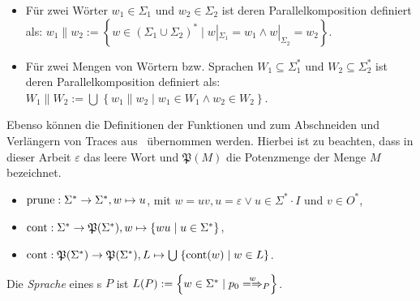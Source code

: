 \begin{Def}\mbox{}
  \begin{itemize}
    \item Für zwei Wörter $w_1\in\Sigma _1$ und $w_2\in\Sigma _2$ ist
      deren Parallelkomposition definiert als: $w_1\| w_2:=\left\{w\in
      (\Sigma _1\cup\Sigma _2)^*\mid w|_{\Sigma _1}=w_1\wedge w|_{\Sigma
    _2}=w_2\right\}$.
    \item Für zwei Mengen von Wörtern bzw. Sprachen $W_1\subseteq \Sigma
      ^*_1$ und $W_2\subseteq \Sigma ^*_2$ ist deren Parallelkomposition
      definiert als: $W_1\| W_2:=\bigcup\hspace{1pt}\left\{w_1\| w_2\mid
      w_1\in W_1\wedge w_2\in W_2\right\}$.
  \end{itemize}
\end{Def}

Ebenso können die Definitionen der Funktionen \prune{} und \cont{} zum
Abschneiden und Verlängern von Traces aus~\cite{Schinko2016BA} übernommen
werden. Hierbei ist zu beachten, dass in dieser Arbeit $\varepsilon$ das leere
Wort und $\mathfrak{P}(M)$ die Potenzmenge der Menge $M$ bezeichnet.

\begin{Def}\mbox{}
  \begin{itemize}
    \item $\mathrm{prune}{}:\Sigma ^*\rightarrow\Sigma ^*, w\mapsto u$, mit $w=uv,
      u=\varepsilon\vee u\in\Sigma ^*\cdot I$ und $v\in O^*$,
    \item $\mathrm{cont}{}:\Sigma ^*\rightarrow\mathfrak{P}(\Sigma ^*),
      w\mapsto\left\{wu\mid u\in\Sigma ^*\right\}$,
    \item $\mathrm{cont}{}:\mathfrak{P}(\Sigma ^*)\rightarrow\mathfrak{P}(\Sigma ^*),
      L\mapsto\bigcup\hspace{1pt}\left\{\mathrm{cont}{}(w)\mid w\in L\right\}$.
  \end{itemize}
\end{Def}

\vspace{0.2cm}

\begin{Def}[Sprache]
  \label{LDef}
  Die \emph{Sprache} eines \MEIO{}s $P$ ist $L(P) := \left\{w\in \Sigma ^* \mid
  p_0\weakmay[w]_P \right\}$.
\end{Def}

